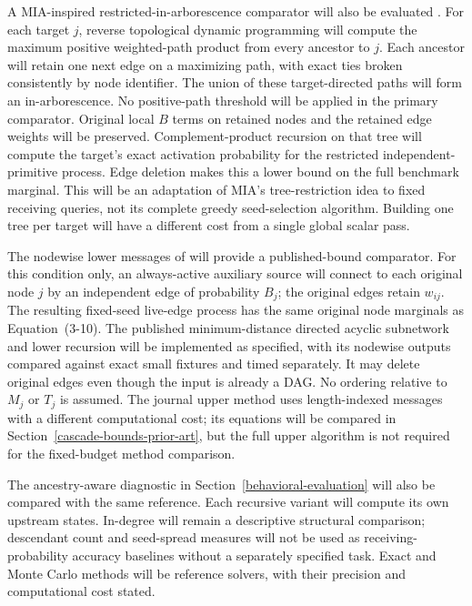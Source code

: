 A MIA-inspired restricted-in-arborescence comparator will also be evaluated
\citep{chen2010mia}. For each target $j$, reverse topological dynamic
programming will compute the maximum positive weighted-path product from
every ancestor to $j$. Each ancestor will retain one next edge on a maximizing
path, with exact ties broken consistently by node identifier. The union of
these target-directed paths will form an in-arborescence. No positive-path
threshold will be applied in the primary comparator. Original local $B$
terms on retained nodes and the retained edge weights will be preserved.
Complement-product recursion on that tree will compute the target's exact
activation probability for the restricted independent-primitive process.
Edge deletion makes this a lower bound on the full benchmark marginal.
This will be an adaptation of MIA's tree-restriction idea to fixed receiving
queries, not its complete greedy seed-selection algorithm. Building one tree
per target will have a different cost from a single global scalar pass.

The nodewise lower messages of \citet[Section~4.1, Equation~22]{abbe2020}
will provide a published-bound comparator. For this condition only, an
always-active auxiliary source will connect to each original node $j$ by
an independent edge of probability $B_j$; the original edges retain
$w_{ij}$. The resulting fixed-seed live-edge process has the same original
node marginals as Equation~(3-10). The published minimum-distance directed
acyclic subnetwork and lower recursion will be implemented as specified,
with its nodewise outputs compared against exact small fixtures and timed
separately. It may delete original edges even though the input is already a
DAG. No ordering relative to $M_j$ or $T_j$ is assumed. The journal upper
method uses length-indexed messages with a different computational cost;
its equations will be compared in Section~\ref{cascade-bounds-prior-art},
but the full upper algorithm is not required for the fixed-budget method
comparison.

The ancestry-aware diagnostic in Section~\ref{behavioral-evaluation} will
also be compared with the same reference. Each recursive variant will
compute its own upstream states. In-degree will remain a descriptive
structural comparison; descendant count and seed-spread measures will not
be used as receiving-probability accuracy baselines without a separately
specified task. Exact and Monte Carlo methods will be reference solvers,
with their precision and computational cost stated.

